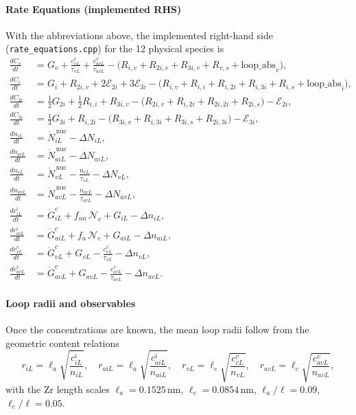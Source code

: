 \documentclass{article}
\begin{document}
\paragraph{Rate Equations (implemented RHS)}
With the abbreviations above, the implemented right-hand side
(\texttt{rate\_equations.cpp}) for the 12 physical species is
\begin{align}
\frac{dC_v}{dt} &= G_v+\frac{c_{vL}^{v}}{\tau_{vL}}+\frac{c_{avL}^{v}}{\tau_{avL}}
   -\bigl(R_{i,v}+R_{2i,v}+R_{3i,v}+R_{v,s}+\text{loop\_abs}_v\bigr),\\
\frac{dC_i}{dt} &= G_i+R_{2i,v}+2\mathcal{E}_{2i}+3\mathcal{E}_{3i}
   -\bigl(R_{i,v}+R_{i,i}+R_{i,2i}+R_{i,3i}+R_{i,s}+\text{loop\_abs}_i\bigr),\\
\frac{dC_{2i}}{dt} &= \tfrac{1}{2}G_{2i}+\tfrac{1}{2}R_{i,i}+R_{3i,v}
   -\bigl(R_{2i,v}+R_{i,2i}+R_{2i,2i}+R_{2i,s}\bigr)-\mathcal{E}_{2i},\\
\frac{dC_{3i}}{dt} &= \tfrac{1}{3}G_{3i}+R_{i,2i}
   -\bigl(R_{3i,v}+R_{i,3i}+R_{3i,s}+R_{2i,3i}\bigr)-\mathcal{E}_{3i},\\
\frac{dn_{iL}}{dt} &= \dot N_{iL}^{\,\mathrm{nuc}}-\Delta N_{iL},\\
\frac{dn_{aiL}}{dt} &= \dot N_{aiL}^{\,\mathrm{nuc}}-\Delta N_{aiL},\\
\frac{dn_{vL}}{dt} &= \dot N_{vL}^{\,\mathrm{nuc}}-\frac{n_{vL}}{\tau_{vL}}-\Delta N_{vL},\\
\frac{dn_{avL}}{dt} &= \dot N_{avL}^{\,\mathrm{nuc}}-\frac{n_{avL}}{\tau_{avL}}-\Delta N_{avL},\\
\frac{dc_{iL}^{i}}{dt} &= \dot{G}_{iL}^{c}+f_{na}\,\mathcal{N}_c+G_{iL}-\Delta n_{iL},\\
\frac{dc_{aiL}^{i}}{dt} &= \dot{G}_{aiL}^{c}+f_{a}\,\mathcal{N}_c+G_{aiL}-\Delta n_{aiL},\\
\frac{dc_{vL}^{v}}{dt} &= \dot{G}_{vL}^{c}+G_{vL}-\frac{c_{vL}^{v}}{\tau_{vL}}-\Delta n_{vL},\\
\frac{dc_{avL}^{v}}{dt} &= \dot{G}_{avL}^{c}+G_{avL}-\frac{c_{avL}^{v}}{\tau_{avL}}-\Delta n_{avL}.
\end{align}

\paragraph{Loop radii and observables}
Once the concentrations are known, the mean loop radii follow from the
geometric content relations
\begin{equation}
r_{iL}=\ell_a\sqrt{\frac{c_{iL}^{i}}{n_{iL}}},\quad
r_{aiL}=\ell_a\sqrt{\frac{c_{aiL}^{i}}{n_{aiL}}},\quad
r_{vL}=\ell_c\sqrt{\frac{c_{vL}^{v}}{n_{vL}}},\quad
r_{avL}=\ell_c\sqrt{\frac{c_{avL}^{v}}{n_{avL}}},
\end{equation}
with the Zr length scales $\ell_a=0.1525\,$nm, $\ell_c=0.0854\,$nm,
$\ell_a/\ell=0.09$, $\ell_c/\ell=0.05$.
\end{document}
